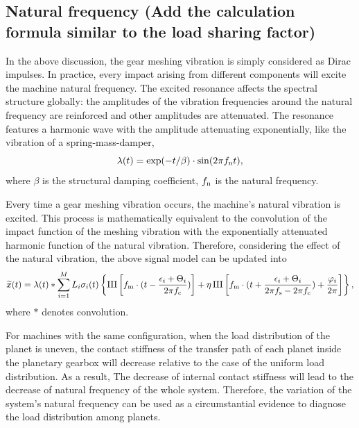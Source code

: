 \documentclass[a4paper,fleqn]{cas-sc}%
\begin{document}
\subsection{Natural frequency (Add the calculation formula similar to the load sharing factor)}
\par In the above discussion, the gear meshing vibration is simply considered as Dirac impulses. In practice, every impact arising from different components will excite the machine natural frequency. The excited resonance affects the spectral structure globally: the amplitudes of the vibration frequencies around the natural frequency are reinforced and other amplitudes are attenuated. The resonance features a harmonic wave with the amplitude attenuating exponentially, like the vibration of a spring-mass-damper,
\begin{equation}
    \lambda(t)=\exp(-t/\beta)\cdot \sin(2 \pi f_{\rm n} t),
\end{equation}
where $\beta$ is the structural damping coefficient, $f_{\rm n}$ is the natural frequency.
\par Every time a gear meshing vibration occurs, the machine's natural vibration is excited. This process is mathematically equivalent to the convolution of the impact function of the meshing vibration with the exponentially attenuated harmonic function of the natural vibration. Therefore, considering the effect of the natural vibration, the above signal model can be updated into
\begin{equation}
    \widetilde{x} (t)=\lambda(t) \ast \sum_{i=1}^{M} L_i \sigma_i(t) \left\{ \operatorname{III}\left[f_{\rm m} \cdot (t-\frac{\epsilon_i+\Theta_i}{2 \pi f_{\rm c}})\right]%
    + \eta \operatorname{III}\left[f_{\rm m} \cdot (t + \frac{\epsilon_i+\Theta_i}{2 \pi f_{\rm s}-2 \pi f_{\rm c}}) + \frac{\varphi_i}{2 \pi} \right]%
    \right\},\label{eq:final_signal_model}
\end{equation}
where $\ast$ denotes convolution.
\par For machines with the same configuration, when the load distribution of the planet is uneven, the contact stiffness of the transfer path of each planet inside the planetary gearbox will decrease relative to the case of the uniform load distribution. As a result, The decrease of internal contact stiffness will lead to the decrease of natural frequency of the whole system. Therefore, the variation of the system's natural frequency can be used as a circumstantial evidence to diagnose the load distribution among planets.
\end{document}

